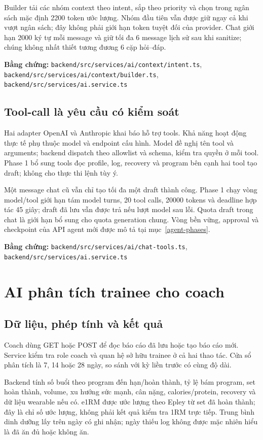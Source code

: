 \documentclass[12pt,a4paper]{article}
\newcommand{\evidence}[1]{{\small\nolinkurl{#1}}}
\begin{document}
Builder tải các nhóm context theo intent, sắp theo priority và chọn trong ngân sách mặc định 2200 token ước lượng. Nhóm đầu tiên vẫn được giữ ngay cả khi vượt ngân sách; đây không phải giới hạn token tuyệt đối của provider. Chat giới hạn 2000 ký tự mỗi message và giữ tối đa 6 message lịch sử sau khi sanitize; chúng không nhất thiết tương đương 6 cặp hỏi--đáp.

\textbf{Bằng chứng:} \evidence{backend/src/services/ai/context/intent.ts}, \evidence{backend/src/services/ai/context/builder.ts}, \evidence{backend/src/services/ai.service.ts}

\subsection{Tool-call là yêu cầu có kiểm soát}
Hai adapter OpenAI và Anthropic khai báo hỗ trợ tools. Khả năng hoạt động thực tế phụ thuộc model và endpoint cấu hình. Model đề nghị tên tool và arguments; backend dispatch theo allowlist và schema, kiểm tra quyền ở mỗi tool. Phase 1 bổ sung tools đọc profile, log, recovery và program bên cạnh hai tool tạo draft; không cho thực thi lệnh tùy ý.

Một message chat cũ vẫn chỉ tạo tối đa một draft thành công. Phase 1 chạy vòng model/tool giới hạn tám model turns, 20 tool calls, 20000 tokens và deadline hợp tác 45 giây; draft đã lưu vẫn được trả nếu lượt model sau lỗi. Quota draft trong chat là giới hạn bổ sung cho quota generation chung. Vòng bền vững, approval và checkpoint của API agent mới được mô tả tại mục~\ref{agent-phases}.

\textbf{Bằng chứng:} \evidence{backend/src/services/ai/chat-tools.ts}, \evidence{backend/src/services/ai.service.ts}

\section{AI phân tích trainee cho coach}

\subsection{Dữ liệu, phép tính và kết quả}
Coach dùng GET hoặc POST  để đọc báo cáo đã lưu hoặc tạo báo cáo mới. Service kiểm tra role coach và quan hệ sở hữu trainee ở cả hai thao tác. Cửa sổ phân tích là 7, 14 hoặc 28 ngày, so sánh với kỳ liền trước có cùng độ dài.

Backend tính số buổi theo program đến hạn/hoàn thành, tỷ lệ bám program, set hoàn thành, volume, xu hướng sức mạnh, cân nặng, calories/protein, recovery và dữ liệu wearable nếu có. e1RM được ước lượng theo Epley từ set đã hoàn thành; đây là chỉ số ước lượng, không phải kết quả kiểm tra 1RM trực tiếp. Trung bình dinh dưỡng lấy trên ngày có ghi nhận; ngày thiếu log không được mặc nhiên hiểu là đã ăn đủ hoặc không ăn.
\end{document}
